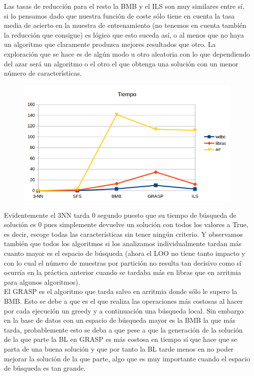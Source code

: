\documentclass[10pt,a4paper]{article}
\begin{document}
Las tasas de reducción para el resto la BMB y el ILS son muy similares entre sí, si lo pensamos dado que nuestra función de coste sólo tiene en cuenta la tasa media de acierto en la muestra de entrenamiento (no tenemos en cuenta también la reducción que consigue) es lógico que esto suceda así, o al menos que no haya un algoritmo que claramente produzca mejores resultados que otro. La exploración que se hace es de algún modo u otro aleatoria con lo que dependiendo del azar será un algoritmo o el otro el que obtenga una solución con un menor número de características.\\


\begin{figure}[H]
\centering
\includegraphics[width=130mm]{tiempo.png}
\end{figure}


Evidentemente el 3NN tarda 0 segundo puesto que su tiempo de búsqueda de solución es 0 pues simplemente devuelve un solución con todos los valores a True, es decir, escoge todas las características sin tener ningún criterio. Y observamos también que todos los algoritmos si los analizamos individualmente tardan más cuanto mayor es el espacio de búsqueda (ahora el LOO no tiene tanto impacto y con lo cual el número de muestras por partición no resulta tan decisivo como sí ocurría en la práctica anterior cuando se tardaba más en libras que en arritmia para algunos algoritmos).\\

El GRASP es el algoritmo que tarda salvo en arritmia donde sólo le supero la BMB. Esto se debe a que es el que realiza las operaciones más costosas al hacer por cada ejecución un greedy y a continuación una búsqueda local. Sin embargo en la base de datos con un espacio de búsqueda mayor es la BMB la que más tarda, probablemente esto se deba a que pese a que la generación de la solución de la que parte la BL en GRASP es más costosa en tiempo sí que hace que se parta de una buena solución y que por tanto la BL tarde menos en no poder mejorar la solución de la que parte, algo que es muy importante cuando el espacio de búsqueda es tan grande.
\end{document}
